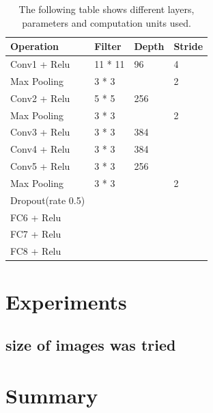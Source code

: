 \documentclass[12pt, a4paper,oneside]{report}
\begin{document}
\begin{table}[!htbp]
	\centering {} \small
	\label{table:2}
	\begin{adjustbox}{max width=1.1\textwidth,center}
		
		\begin{tabular}{|p{3cm}|p{3cm}|p{3cm}|p{3cm}|}
			\hline	
			Operation & Filter & Depth & Stride \\ \hline
			
			Conv1 + Relu  &  11 * 11  & 96  & 4 \\  \hline	 
			
			Max Pooling & 3 * 3  &  & 2 \\ \hline	   
			
			Conv2 + Relu & 5 * 5 & 256  &  \\ \hline	
			
			Max Pooling & 3 * 3 & & 2 \\ \hline
			
			Conv3 + Relu & 3 * 3 & 384 &  \\ \hline	
					
			
			Conv4 + Relu & 3 * 3  & 384  &  \\ \hline	
			
		    
		    Conv5 + Relu & 3 * 3  & 256 &  \\ \hline	
		    
		    Max Pooling & 3 * 3 & & 2 \\ \hline
		    
		    Dropout(rate 0.5) &  & & \\ \hline
		    
		    FC6 + Relu &  & & \\ \hline
		    
		    FC7 + Relu &  & & \\ \hline
		    
		    FC8 + Relu &  & & \\ \hline
		   
		\end{tabular}
	
	\end{adjustbox}

		\caption {The following table shows different layers, parameters and computation units used.}	
	
	
\end{table}












\chapter{Experiments}

\section{size of images was tried}


\chapter{Summary}



\end{document}
